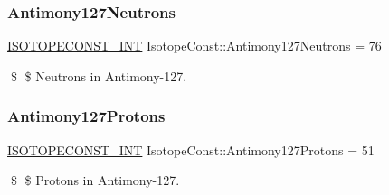 \subsubsection{\texorpdfstring{Antimony127\+Neutrons}{Antimony127Neutrons}}
{\footnotesize\ttfamily \mbox{\hyperlink{group___isotope_const-_macros_ga5f18360b3e99483a35c32d789e62621c}{I\+S\+O\+T\+O\+P\+E\+C\+O\+N\+S\+T\+\_\+\+I\+NT}} Isotope\+Const\+::\+Antimony127\+Neutrons = 76}

\$ \$ Neutrons in Antimony-\/127. \mbox{\label{group___isotope_const-_antimony-_sb127_ga804fdf61b773f1cf23ca90e342ffe2a3}} 
\subsubsection{\texorpdfstring{Antimony127\+Protons}{Antimony127Protons}}
{\footnotesize\ttfamily \mbox{\hyperlink{group___isotope_const-_macros_ga5f18360b3e99483a35c32d789e62621c}{I\+S\+O\+T\+O\+P\+E\+C\+O\+N\+S\+T\+\_\+\+I\+NT}} Isotope\+Const\+::\+Antimony127\+Protons = 51}

\$ \$ Protons in Antimony-\/127. 